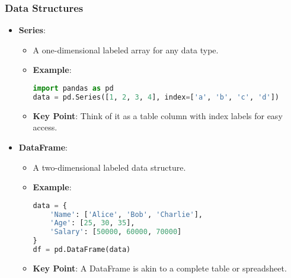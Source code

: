 \documentclass[aspectratio=169]{beamer}
\begin{document}
\begin{frame}[fragile]
    \frametitle{Data Structures}
    \begin{itemize}
        \item \textbf{Series}:
            \begin{itemize}
                \item A one-dimensional labeled array for any data type.
                \item \textbf{Example}:
                \begin{lstlisting}[language=Python]
import pandas as pd
data = pd.Series([1, 2, 3, 4], index=['a', 'b', 'c', 'd'])
                \end{lstlisting}
                \item \textbf{Key Point}: Think of it as a table column with index labels for easy access.
            \end{itemize}
        
        \item \textbf{DataFrame}:
            \begin{itemize}
                \item A two-dimensional labeled data structure.
                \item \textbf{Example}:
                \begin{lstlisting}[language=Python]
data = {
    'Name': ['Alice', 'Bob', 'Charlie'],
    'Age': [25, 30, 35],
    'Salary': [50000, 60000, 70000]
}
df = pd.DataFrame(data)
                \end{lstlisting}
                \item \textbf{Key Point}: A DataFrame is akin to a complete table or spreadsheet.
            \end{itemize}
    \end{itemize}
\end{frame}
\end{document}
